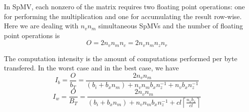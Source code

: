 \documentclass[10pt,conference,compsocconf]{IEEEtran}
\newcommand{\ceil}[1]{\left\lceil#1\right\rceil}
\begin{document}
In SpMV, each nonzero of the matrix requires two floating point
operations: one for performing the multiplication and one for
accumulating the result row-wise. Here we are dealing with $n_v n_m$
simultaneous SpMVs and the number of floating point operations is
$$O = 2 n_v n_m n_c = 2 n_v n_m n_z n_r$$

The computation intensity is the amount of computations performed per
byte transfered. In the worst case and in the best case, we have
$$I_b = \frac{O}{b_T} = \frac{2 n_v n_m}{ (b_i + b_x n_m) + n_v n_m b_x n_z^{-1} + n_v b_x n_z^{-1} }$$
$$I_w = \frac{O}{B_T} = \frac{2 n_v n_m}{(b_i+b_x n_m) + n_v n_m b_x n_z^{-1} + cl \ceil{\frac{n_vb_x}{cl}} }$$



\end{document}
